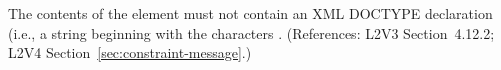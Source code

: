 The contents of the  element must not contain an XML
DOCTYPE declaration (i.e., a string beginning with the characters
.  (References: L2V3 Section~4.12.2; L2V4 Section~\ref{sec:constraint-message}.)
